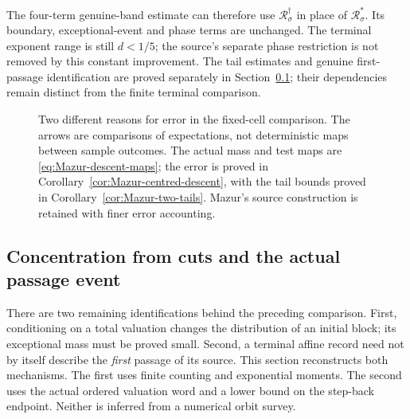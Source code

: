 The four-term genuine-band estimate can therefore use
$\mathcal R_\sigma^\dagger$ in place of $\mathcal R_\sigma^*$.
Its boundary, exceptional-event and phase terms are unchanged.
The terminal exponent range is still $d<1/5$; the source's separate
phase restriction is not removed by this constant improvement.
The tail estimates and genuine first-passage identification are proved
separately in Section~\ref{sec:Mazur-concentration-coverage}; their
dependencies remain distinct from the finite terminal comparison.

\begin{figure}[ht]
\centering
{}
\caption{Two different reasons for error in the fixed-cell comparison.
The arrows are comparisons of expectations, not deterministic maps
between sample outcomes. The actual mass and test maps are
\eqref{eq:Mazur-descent-maps}; the error is proved in
Corollary~\ref{cor:Mazur-centred-descent}, with the tail bounds proved in
Corollary~\ref{cor:Mazur-two-tails}.
Mazur's source construction is retained with finer error accounting.}
\label{fig:Mazur-descent}
\end{figure}

\subsection{Concentration from cuts and the actual passage event}
\label{sec:Mazur-concentration-coverage}

There are two remaining identifications behind the preceding comparison.
First, conditioning on a total valuation changes the distribution of an
initial block; its exceptional mass must be proved small.
Second, a terminal affine record need not by itself describe the
\emph{first} passage of its source. This section reconstructs both
mechanisms. The first uses finite counting and exponential moments.
The second uses the actual ordered valuation word and a lower bound on
the step-back endpoint. Neither is inferred from a numerical orbit survey.


